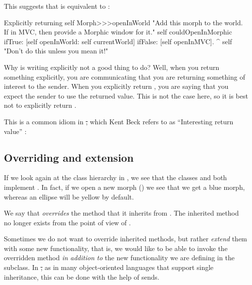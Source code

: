 \documentclass[a4paper,10pt,twoside]{book}
\begin{document}
This suggests that  is equivalent to :

\begin{method}[openInWorldReturnSelf]{Explicitly returning self}
Morph>>>openInWorld
	"Add this morph to the world.  If in MVC,
	then provide a Morphic window for it."
	self couldOpenInMorphic
		ifTrue: [self openInWorld: self currentWorld]
		ifFalse: [self openInMVC].
	^ self		"Don't do this unless you mean it!"
\end{method}

Why is writing  explicitly not a good thing to do?
Well, when you return something explicitly, you are communicating that you are returning something of interest to the sender.
When you explicitly return \self, you are saying that you expect the sender to use the returned value.
This is not the case here, so it is best not to explicitly return \self.

This is a common idiom in \st, which Kent Beck refers to as ``Interesting return value'' \cite{Beck97a}:


\subsection{Overriding and extension}

If we look again at the  class hierarchy in , we see that the classes  and \mbox{} both implement .
In fact, if we open a new morph () we see that we get a blue morph, whereas an ellipse will be yellow by default.

We say that  \emph{overrides} the  method that it inherits from .
The inherited method no longer exists from the point of view of .

Sometimes we do not want to override inherited methods, but rather \emph{extend} them with some new functionality, that is, we would like to be able to invoke the overridden method \emph{in addition to} the new functionality we are defining in the subclass.
In \st, as in many object-oriented languages that support single inheritance, this can be done with the help of \super sends.
\end{document}
